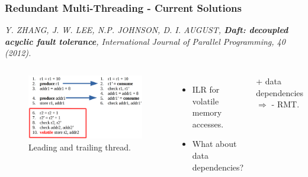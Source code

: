\documentclass[xcolor=pdftex,dvipsnames,table]{beamer}
\begin{document}
   
\begin{frame}
	\frametitle{Redundant Multi-Threading - Current Solutions}  
    
    \emph{Y. ZHANG, J. W. LEE, N.P. JOHNSON, D. I. AUGUST, \textbf{Daft: decoupled acyclic fault tolerance}, International Journal of Parallel Programming, 40 (2012).}
    
    \begin{columns}[c]
    	\column{2.6in}
        	\begin{figure}[H]
            	\begin{center}
                	\captionsetup{labelformat=empty,labelsep=none}
                  	\includegraphics[scale=0.2]{Daft-Reduced.png} 
                  	\caption{Leading and trailing thread.}
              	\end{center}
          	\end{figure}
        \column{2in}
    	\begin{itemize}    
    		\item ILR for volatile memory accesses. \pause
            \item What about data dependencies? \pause
    	\end{itemize}	    		
   			\begin{shaded}
    			\centerline{+ data dependencies $\Rightarrow$ - RMT. } 
          \end{shaded}
    \end{columns}            
\end{frame}
\end{document}
